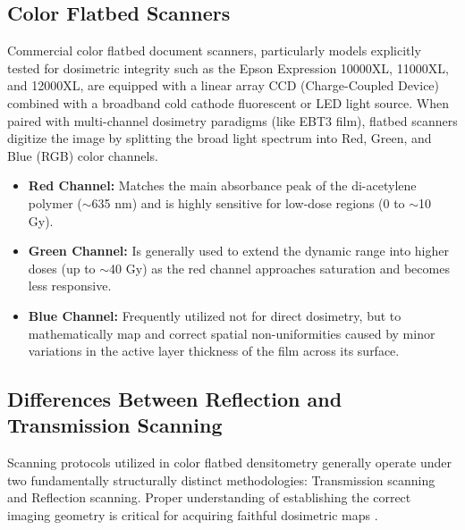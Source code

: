 \subsection{Color Flatbed Scanners}
Commercial color flatbed document scanners, particularly models explicitly tested for dosimetric integrity such as the Epson Expression 10000XL, 11000XL, and 12000XL, are equipped with a linear array CCD (Charge-Coupled Device) combined with a broadband cold cathode fluorescent or LED light source. 
When paired with multi-channel dosimetry paradigms (like EBT3 film), flatbed scanners digitize the image by splitting the broad light spectrum into Red, Green, and Blue (RGB) color channels.
\begin{itemize}
    \item \textbf{Red Channel:} Matches the main absorbance peak of the di-acetylene polymer ($\sim$635 nm) and is highly sensitive for low-dose regions (0 to $\sim$10 Gy).
    \item \textbf{Green Channel:} Is generally used to extend the dynamic range into higher doses (up to $\sim$40 Gy) as the red channel approaches saturation and becomes less responsive.
    \item \textbf{Blue Channel:} Frequently utilized not for direct dosimetry, but to mathematically map and correct spatial non-uniformities caused by minor variations in the active layer thickness of the film across its surface.
\end{itemize}

\subsection{Differences Between Reflection and Transmission Scanning}

Scanning protocols utilized in color flatbed densitometry generally operate under two fundamentally structurally distinct methodologies: Transmission scanning and Reflection scanning. Proper understanding of establishing the correct imaging geometry is critical for acquiring faithful dosimetric maps \cite{niroomand2020}.

